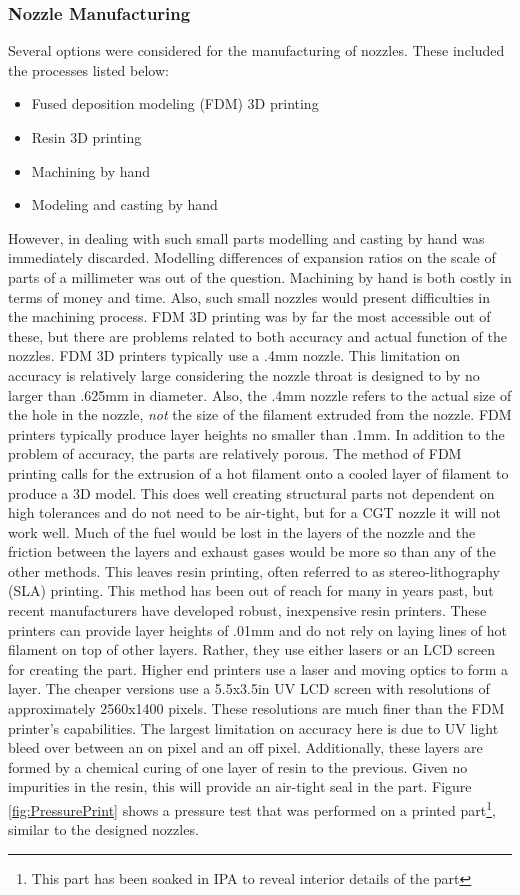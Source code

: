 \subsubsection{Nozzle Manufacturing}
Several options were considered for the manufacturing of nozzles. These included the processes listed below:
\begin{itemize}
\item Fused deposition modeling (FDM) 3D printing
\item Resin 3D printing
\item Machining by hand
\item Modeling and casting by hand
\end{itemize}
However, in dealing with such small parts modelling and casting by hand was immediately discarded. Modelling differences of expansion ratios on the scale of parts of a millimeter was out of the question. Machining by hand is both costly in terms of money and time. Also, such small nozzles would present difficulties in the machining process. FDM 3D printing was by far the most accessible out of these, but there are problems related to both accuracy and actual function of the nozzles. FDM 3D printers typically use a .4mm nozzle. This limitation on accuracy is relatively large considering the nozzle throat is designed to by no larger than .625mm in diameter. Also, the .4mm nozzle refers to the actual size of the hole in the nozzle, \textit{not} the size of the filament extruded from the nozzle. FDM printers typically produce layer heights no smaller than .1mm. In addition to the problem of accuracy, the parts are relatively porous. The method of FDM printing calls for the extrusion of a hot filament onto a cooled layer of filament to produce a 3D model. This does well creating structural parts not dependent on high tolerances and do not need to be air-tight, but for a CGT nozzle it will not work well. Much of the fuel would be lost in the layers of the nozzle and the friction between the layers and exhaust gases would be more so than any of the other methods. This leaves resin printing, often referred to as stereo-lithography (SLA) printing. This method has been out of reach for many in years past, but recent manufacturers have developed robust, inexpensive resin printers. These printers can provide layer heights of .01mm and do not rely on laying lines of hot filament on top of other layers. Rather, they use either lasers or an LCD screen for creating the part. Higher end printers use a laser and moving optics to form a layer. The cheaper versions use a 5.5x3.5in UV LCD screen with resolutions of approximately 2560x1400 pixels. These resolutions are much finer than the FDM printer's capabilities. The largest limitation on accuracy here is due to UV light bleed over between an on pixel and an off pixel. Additionally, these layers are formed by a chemical curing of one layer of resin to the previous. Given no impurities in the resin, this will provide an air-tight seal in the part. Figure \ref{fig:PressurePrint} shows a pressure test that was performed on a printed part\footnote{This part has been soaked in IPA to reveal interior details of the part}, similar to the designed nozzles.
